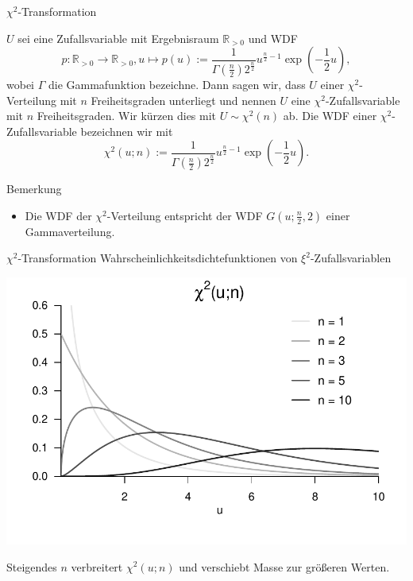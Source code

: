 \documentclass[
  8pt,
  ignorenonframetext,
]{beamer}
\providecommand{\tightlist}{%
  \setlength{\itemsep}{0pt}\setlength{\parskip}{0pt}}
\begin{document}
\begin{frame}{\(\chi^2\)-Transformation}
\protect\hypertarget{chi2-transformation}{}
\small
\begin{definition}
\justifying
$U$ sei eine Zufallsvariable mit Ergebnisraum $\mathbb{R}_{>0}$ und WDF
\begin{equation}
p : \mathbb{R}_{>0} \to \mathbb{R}_{>0},
u \mapsto p(u)
:= \frac{1}{\Gamma\left(\frac{n}{2}\right)2^{\frac{n}{2}}}
u^{\frac{n}{2}-1}\exp\left(-\frac{1}{2}u\right),
\end{equation}
wobei $\Gamma$ die Gammafunktion bezeichne. Dann sagen wir, dass $U$ einer
$\chi^2$-Verteilung mit $n$ Freiheitsgraden unterliegt und nennen $U$ eine
$\chi^2$-Zufallsvariable mit $n$ Freiheitsgraden. Wir kürzen dies mit
$U \sim \chi^2(n)$ ab. Die WDF einer $\chi^2$-Zufallsvariable bezeichnen wir mit
\begin{equation}
\chi^2(u;n) :=
\frac{1}{\Gamma\left(\frac{n}{2}\right)2^{\frac{n}{2}}}
u^{\frac{n}{2}-1}\exp\left(-\frac{1}{2}u\right).
\end{equation}
\end{definition}

Bemerkung

\begin{itemize}
\tightlist
\item
  Die WDF der \(\chi^2\)-Verteilung entspricht der WDF
  \(G\left(u;\frac{n}{2},2\right)\) einer Gammaverteilung.
\end{itemize}
\end{frame}

\begin{frame}{\(\chi^2\)-Transformation}
\protect\hypertarget{chi2-transformation-1}{}
Wahrscheinlichkeitsdichtefunktionen von \(\xi^2\)-Zufallsvariablen

\vfill
\center

\begin{center}\includegraphics[width=0.8\linewidth]{8_Abbildungen/wtfi_8_chi2_wdf} \end{center}
\small

Steigendes \(n\) verbreitert \(\chi^2(u;n)\) und verschiebt Masse zur
größeren Werten.
\end{frame}
\end{document}
